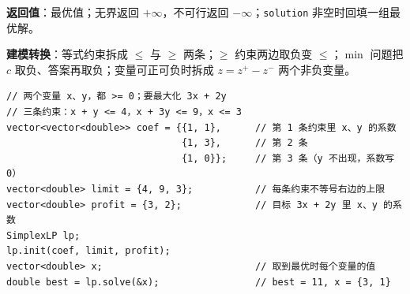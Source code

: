 		\textbf{返回值}：最优值；无界返回 $+\infty$，不可行返回 $-\infty$；\texttt{solution} 非空时回填一组最优解。

		\textbf{建模转换}：等式约束拆成 $\le$ 与 $\ge$ 两条；$\ge$ 约束两边取负变 $\le$；$\min$ 问题把 $c$ 取负、答案再取负；变量可正可负时拆成 $z = z^{+} - z^{-}$ 两个非负变量。

		\begin{verbatim}
// 两个变量 x、y，都 >= 0；要最大化 3x + 2y
// 三条约束：x + y <= 4，x + 3y <= 9，x <= 3
vector<vector<double>> coef = {{1, 1},      // 第 1 条约束里 x、y 的系数
                               {1, 3},      // 第 2 条
                               {1, 0}};     // 第 3 条（y 不出现，系数写 0）
vector<double> limit = {4, 9, 3};           // 每条约束不等号右边的上限
vector<double> profit = {3, 2};             // 目标 3x + 2y 里 x、y 的系数
SimplexLP lp;
lp.init(coef, limit, profit);
vector<double> x;                           // 取到最优时每个变量的值
double best = lp.solve(&x);					// best = 11, x = {3, 1}
		\end{verbatim}

